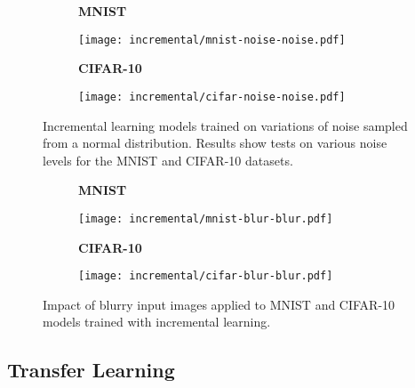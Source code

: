 \documentclass[conference]{IEEEtran}
\begin{document}
\begin{figure}[H]
    \centering
    \begin{subfigure}[h]{0.30\textwidth}
        \centering
        \textbf{MNIST}\par\medskip
        \texttt{[image: incremental/mnist-noise-noise.pdf]}
        \caption{} 
        \label{fig:incremental-mnist-noise}
    \end{subfigure}
    \quad
    \begin{subfigure}[h]{0.30\textwidth}  
        \centering 
        \textbf{CIFAR-10}\par\medskip
        \texttt{[image: incremental/cifar-noise-noise.pdf]}
        \caption{} 
        \label{fig:incremental-cifar-noise}
    \end{subfigure}
    \captionsetup{width=0.80\linewidth}
    \caption{Incremental learning models trained on variations of noise sampled from a normal distribution. Results show tests on various noise levels for the MNIST and CIFAR-10 datasets.} 
    \label{fig:incremental-noise}
\end{figure}

\begin{figure}[H]
    \centering
    \begin{subfigure}[h]{0.30\textwidth}
        \centering
        \textbf{MNIST}\par\medskip
        \texttt{[image: incremental/mnist-blur-blur.pdf]}
        \caption{} 
        \label{fig:incremental-mnist-blur}
    \end{subfigure}
    \quad
    \begin{subfigure}[h]{0.30\textwidth}  
        \centering 
        \textbf{CIFAR-10}\par\medskip
        \texttt{[image: incremental/cifar-blur-blur.pdf]}
        \caption{} 
        \label{fig:incremental-cifar-blur}
    \end{subfigure}
    \captionsetup{width=0.80\linewidth}
    \caption{Impact of blurry input images applied to MNIST and CIFAR-10 models trained with incremental learning.} 
    \label{fig:incremental-blur}
\end{figure}

\newpage

\subsection{Transfer Learning}
\end{document}
